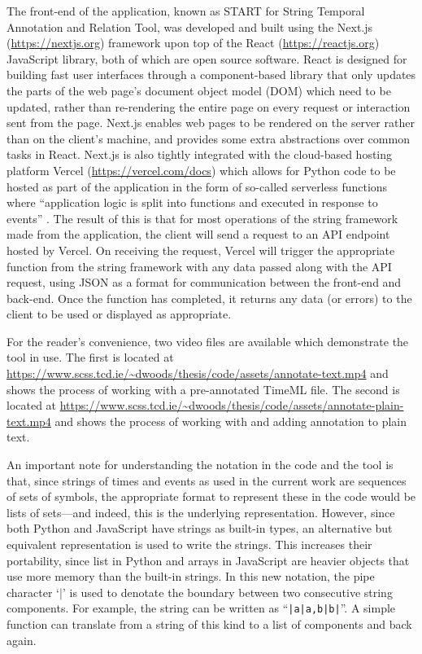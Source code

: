 \documentclass[a4paper,12pt,leqno,twoside]{article}
\newcommand{\vph}[1]{\vphantom{#1}}
\newcommand{\ebox}[1]{\fbox{$\vph{'(),}#1$}}
\newcommand{\EventString}[1]{%
	\renewcommand*{\do}[1]{\ebox{##1}}%
	\PipeParser{#1}%
}
\begin{document}
The front-end of the application, known as START for String Temporal Annotation and Relation Tool, was developed and built using the Next.js (\url{https://nextjs.org}) framework upon top of the React (\url{https://reactjs.org}) JavaScript library, both of which are open source software. React is designed for building fast user interfaces through a component-based library that only updates the parts of the web page's document object model (DOM) which need to be updated, rather than re-rendering the entire page on every request or interaction sent from the page. Next.js enables web pages to be rendered on the server rather than on the client's machine, and provides some extra abstractions over common tasks in React. Next.js is also tightly integrated with the cloud-based hosting platform Vercel (\url{https://vercel.com/docs}) which allows for Python code to be hosted as part of the application in the form of so-called serverless functions \citep{anderson1995serverless} where ``application logic is split into functions and executed in response to events'' \citep[p. 405]{mcgrath2017serverless}. The result of this is that for most operations of the string framework made from the application, the client will send a request to an API endpoint hosted by Vercel. On receiving the request, Vercel will trigger the appropriate function from the string framework with any data passed along with the API request, using JSON as a format for communication between the front-end and back-end. Once the function has completed, it returns any data (or errors) to the client to be used or displayed as appropriate.

For the reader's convenience, two video files are available which demonstrate the tool in use. The first is located at \url{https://www.scss.tcd.ie/~dwoods/thesis/code/assets/annotate-text.mp4} and shows the process of working with a pre-annotated TimeML file. The second is located at \url{https://www.scss.tcd.ie/~dwoods/thesis/code/assets/annotate-plain-text.mp4} and shows the process of working with and adding annotation to plain text.

An important note for understanding the notation in the code and the tool is that, since strings of times and events as used in the current work are sequences of sets of symbols, the appropriate format to represent these in the code would be lists of sets---and indeed, this is the underlying representation. However, since both Python and JavaScript have strings as built-in types, an alternative but equivalent representation is used to write the strings. This increases their portability, since list in Python and arrays in JavaScript are heavier objects that use more memory than the built-in strings. In this new notation, the pipe character `$|$' is used to denotate the boundary between two consecutive string components. For example, the string \EventString{{}|a|a,b|b|{}} can be written as ``\verb!|a|a,b|b|!''. A simple function can translate from a string of this kind to a list of components and back again.
\end{document}
